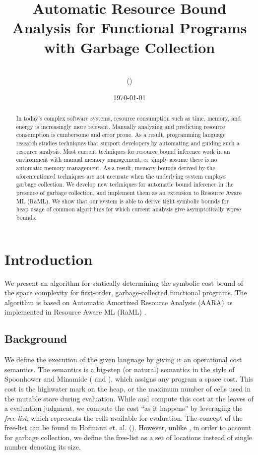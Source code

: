 \documentclass[11pt]{article}
\title{Automatic Resource Bound Analysis for Functional Programs with Garbage Collection}
\author{\myname\\(\myandrewid)}
\date{\today}
\theoremstyle{definition}
\begin{document}
\RaggedRight
\maketitle
{}

\begin{abstract}
In today’s complex software systems, resource consumption such as time, memory, and energy is
increasingly more relevant. Manually analyzing and predicting resource consumption is cumbersome
and error prone. As a result, programming language research studies techniques that support developers
by automating and guiding such a resource analysis. Most current techniques for resource bound
inference work in an environment with manual memory management, or simply assume there is no
automatic memory management. As a result, memory bounds derived by the aforementioned techniques
are not accurate when the underlying system employs garbage collection. We
develop new techniques for automatic bound inference in the presence of garbage collection, and 
implement them as an extension to Resource Aware ML (RaML). We show that our system is able to 
derive tight symbolic bounds for heap usage of common algorithms for which current analysis give 
asymptotically worse bounds.
\end{abstract}

\section{Introduction}

\noindent
We present an algorithm for statically determining the symbolic cost bound 
of the space complexity for first-order, garbage-collected functional programs. 
The algorithm is based on Automatic Amortized Resource Analysis (AARA) as implemented 
in Resource Aware ML (RaML) \cite{Hoffmann:2017:TAR:3009837.3009842}.

\subsection{Background}
\label{sect:background}

We define the execution of the given language by giving it an
operational cost semantics. The semantics is a big-step
(or natural) semantics in the style of Spoonhower and Minamide (\cite{Spoonhower:2008:SPP:1411204.1411240} and 
\cite{DBLP:journals/entcs/Minamide99}), which assigns any program a space cost. This cost is
the highwater mark on the heap, or the maximum number of cells used in the mutable store during 
evaluation. While \cite{Spoonhower:2008:SPP:1411204.1411240} and 
\cite{DBLP:journals/entcs/Minamide99} compute this cost at the leaves of a 
evaluation judgment, we compute the cost ``as it happens'' by leveraging the \emph{free-list},
which represents the cells available for evaluation. 
The concept of the free-list can be found in Hofmann et. al. (\cite{Hofmann:2003:SPH:604131.604148}).
However, unlike \cite{Hofmann:2003:SPH:604131.604148}, in order to account for garbage collection,
we define the free-list as a set of locations instead of single number denoting its size.\\
\end{document}
